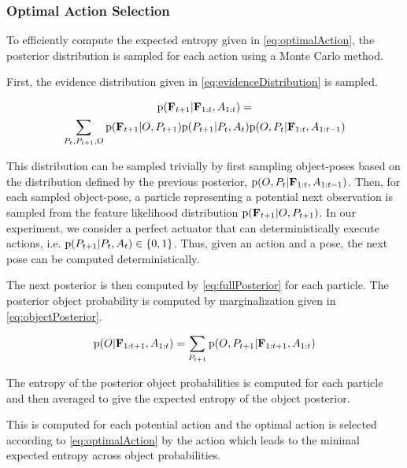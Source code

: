             \subsubsection{Optimal Action Selection}

                To efficiently compute the expected entropy given in \eqref{eq:optimalAction}, the posterior distribution is sampled for each action using a Monte Carlo method. 

                First, the evidence distribution given in \eqref{eq:evidenceDistribution} is sampled.

                {\small
                \begin{multline}
                    \label{eq:evidenceDistribution}
                    \prob{\set{F}_{t+1}|\set{F}_{1:t}, A_{1:t}} = \\ \sum_{P_t,P_{t+1},O}  \prob{\set{F}_{t+1}|O,P_{t+1}} \prob{P_{t+1}|P_t,A_t} \prob{O,P_t|\set{F}_{1:t},A_{1:t-1}}
                \end{multline}
                }

%

                This distribution can be sampled trivially by first sampling object-poses based on the distribution defined by the previous posterior, $\text{p}(O,P_t|\mathbf{F}_{1:t},A_{1:t-1})$. Then, for each sampled object-pose, a particle representing a potential next observation is sampled from the feature likelihood distribution $\text{p}(\mathbf{F}_{t+1}|O,P_{t+1})$. In our experiment, we consider a perfect actuator that can deterministically execute actions, i.e. $\text{p}(P_{t+1}|P_t,A_t) \in \{ 0 , 1 \}$. Thus, given an action and a pose, the next pose can be computed deterministically.

                The next posterior is then computed by \eqref{eq:fullPosterior} for each particle. The posterior object probability is computed by marginalization given in \eqref{eq:objectPosterior}.

                \begin{equation}
                    \label{eq:objectPosterior}
                    \prob{O|\set{F}_{1:t+1},A_{1:t}} = \sum_{P_{t+1}} \prob{O,P_{t+1}|\set{F}_{1:t+1},A_{1:t}}
                \end{equation}

                The entropy of the posterior object probabilities is computed for each particle and then averaged to give the expected entropy of the object posterior. 

                This is computed for each potential action and the optimal action is selected according to \eqref{eq:optimalAction} by the action which leads to the minimal expected entropy across object probabilities.
